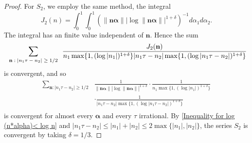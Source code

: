 \documentclass[11pt]{article}
\newcommand{\fc}{\frac}
\renewcommand{\l}{\left}
\renewcommand{\r}{\right}
\renewcommand{\a}{\alpha}
\renewcommand{\(}{\left(}
\renewcommand{\)}{\right)}
\renewcommand{\bf}{\mathbf}
\newcommand{\ba}{\begin{array}}
\newcommand{\ea}{\end{array}}
\renewcommand{\d}{\delta}
\newcommand{\bal}{\begin{aligned}}
\newcommand{\eal}{\end{aligned}}
\newcommand{\n}{\bf{n}}
\newcommand{\bma}{\bm{\alpha}}
\newcommand{\<}{\langle}
\renewcommand{\>}{\rangle}
\begin{document}
\begin{proof}
For $S_2$, we employ the same method, the integral
$$
J_2(n)=\int_0^1\int_0^1 \l(\|\n\bma\|\l|\log \|\n\bma\|\r|^{1+\d}\r)^{-1} d\a_1d\a_2 .
$$
The integral has an finite value independent of $\n$. 
Hence the sum 
$$
\sum_{\mbox{\scriptsize $\ba{c} \n: |n_1\tau-n_2| \ge 1/2 \ea$}} \fc{J_2(\n)}{n_1\max\{1,(\log |n_1|)^{1+\d}\}|n_1\tau-n_2|\max\{1,(\log |n_1\tau-n_2|)^{1+\d}\}}
$$
is convergent, and so 
$$
\bal
\sum_{\n:|n_1\tau-n_2|\ge 1/2} &\fc{1}{\|\n\bma\|\l|\log \|\n\bma\|\r|^{1+\d}}\cdot \fc{1}{n_1\max\{1,(\log |n_1|)^{1+\d}\}}\\
&\cdot\fc{1}{|n_1\tau-n_2|\max\{1,(\log |n_1\tau-n_2|)^{1+\d}\}}\\
\eal
$$
is convergent for almost every $\bma$ and every $\tau$ irrational. 
By \eqref{Inequality for log (n*alpha)< log n} and $|n_1\tau-n_2|\le |n_1|+|n_2|\le 2\max\{|n_1|,|n_2|\}$, the series $S_2$ is convergent by taking $\d= 1/3$. 
\end{proof}
\end{document}
